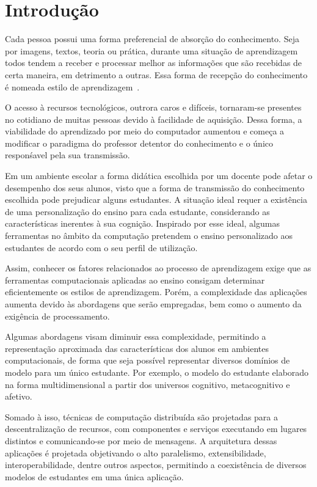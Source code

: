 \chapter{Introdução}

Cada pessoa possui uma forma preferencial de absorção do conhecimento. Seja por imagens, textos, teoria ou prática, durante uma situação de aprendizagem todos tendem a receber e processar melhor as informações que são recebidas de certa maneira, em detrimento a outras. Essa forma de recepção do conhecimento é nomeada estilo de aprendizagem~\cite{felder1988learning}.
 
O acesso à recursos tecnológicos, outrora caros e difíceis, tornaram-se presentes no cotidiano de muitas pessoas devido à facilidade de aquisição. Dessa forma, a viabilidade do aprendizado por meio do computador aumentou e começa a modificar o paradigma do professor detentor do conhecimento e o único responśavel pela sua transmissão.

Em um ambiente escolar a forma didática escolhida por um docente pode afetar o desempenho dos seus alunos, visto que a forma de transmissão do conhecimento escolhida pode prejudicar alguns estudantes. A situação ideal requer a existência de uma personalização do ensino para cada estudante, considerando as características inerentes à sua cognição. Inspirado por esse ideal, algumas ferramentas no âmbito da computação pretendem o ensino personalizado aos estudantes de acordo com o seu perfil de utilização.

Assim, conhecer os fatores relacionados ao processo de aprendizagem exige que as ferramentas computacionais aplicadas ao ensino consigam determinar eficientemente os estilos de aprendizagem. Porém, a complexidade das aplicações aumenta devido às abordagens que serão empregadas, bem como o aumento da exigência de processamento.

Algumas abordagens visam diminuir essa complexidade, permitindo a representação aproximada das características dos alunos em ambientes computacionais, de forma que seja possível representar diversos domínios de modelo para um único estudante. Por exemplo, o modelo do estudante elaborado na forma multidimensional a partir dos universos cognitivo, metacognitivo e afetivo.

Somado à isso, técnicas de computação distribuída são projetadas para a descentralização de recursos, com componentes e serviços executando em lugares distintos e comunicando-se por meio de mensagens. A arquitetura dessas aplicações é projetada objetivando o alto paralelismo, extensibilidade, interoperabilidade, dentre outros aspectos, permitindo a coexistência de diversos modelos de estudantes em uma única aplicação.

